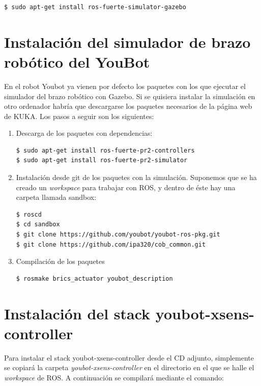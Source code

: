 \documentclass[12pt, a4paper]{report}
\begin{document}
\begin{verbatim}
$ sudo apt-get install ros-fuerte-simulator-gazebo
\end{verbatim}

\section{Instalación del simulador de brazo robótico del YouBot}

En el robot Youbot ya vienen por defecto los paquetes con los que ejecutar el simulador del brazo robótico con Gazebo. Si se quisiera instalar la simulación en otro ordenador habría que descargarse los paquetes necesarios de la página web de KUKA. Los pasos a seguir son los siguientes:

\begin{enumerate}
\item Descarga de los paquetes con dependencias:

\begin{verbatim}
$ sudo apt-get install ros-fuerte-pr2-controllers
$ sudo apt-get install ros-fuerte-pr2-simulator
\end{verbatim}

\item Instalación desde git de los paquetes con la simulación. Suponemos que se ha creado un \textit{workspace} para trabajar con ROS, y dentro de éste hay una carpeta llamada sandbox:

\begin{verbatim}
$ roscd
$ cd sandbox
$ git clone https://github.com/youbot/youbot-ros-pkg.git
$ git clone https://github.com/ipa320/cob_common.git
\end{verbatim}

\item Compilación de los paquetes

\begin{verbatim}
$ rosmake brics_actuator youbot_description
\end{verbatim}

\end{enumerate}

\section{Instalación del stack youbot-xsens-controller}

Para instalar el stack youbot-xsens-controller desde el CD adjunto, simplemente se copiará la carpeta \textit{youbot-xsens-controller} en el directorio en el que se halle el \textit{workspace} de ROS. A continuación se compilará mediante el comando:
\end{document}
